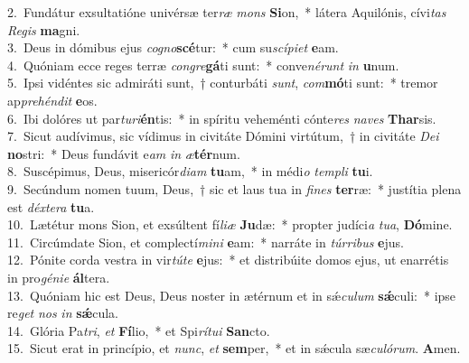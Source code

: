 {2.~}Fundátur exsultatióne univérsæ ter\textit{ræ} \textit{mons} \textbf{Si}on,~* látera Aquilónis, cívi\textit{tas} \textit{Re}\textit{gis} \textbf{ma}gni.\\
{3.~}Deus in dómibus ejus \textit{co}\textit{gno}\textbf{scé}tur:~* cum su\textit{scí}\textit{pi}\textit{et} \textbf{e}am.\\
{4.~}Quóniam ecce reges terræ \textit{con}\textit{gre}\textbf{gá}ti sunt:~* conve\textit{né}\textit{runt} \textit{in} \textbf{u}num.\\
{5.~}Ipsi vidéntes sic admiráti sunt,~† conturbáti \textit{sunt}, \textit{com}\textbf{mó}ti sunt:~* tremor ap\textit{pre}\textit{hén}\textit{dit} \textbf{e}os.\\
{6.~}Ibi dolóres ut par\textit{tu}\textit{ri}\textbf{én}tis:~* in spíritu veheménti cónte\textit{res} \textit{na}\textit{ves} \textbf{Thar}sis.\\
{7.~}Sicut audívimus, sic vídimus in civitáte Dómini virtútum,~† in civitáte \textit{De}\textit{i} \textbf{no}stri:~* Deus fundávit e\textit{am} \textit{in} \textit{æ}\textbf{tér}num.\\
{8.~}Suscépimus, Deus, misericór\textit{di}\textit{am} \textbf{tu}am,~* in médi\textit{o} \textit{tem}\textit{pli} \textbf{tu}i.\\
{9.~}Secúndum nomen tuum, Deus,~† sic et laus tua in \textit{fi}\textit{nes} \textbf{ter}ræ:~* justítia plena est \textit{déx}\textit{te}\textit{ra} \textbf{tu}a.\\
{10.~}Lætétur mons Sion, et exsúltent fí\textit{li}\textit{æ} \textbf{Ju}dæ:~* propter judíci\textit{a} \textit{tu}\textit{a}, \textbf{Dó}mine.\\
{11.~}Circúmdate Sion, et complectí\textit{mi}\textit{ni} \textbf{e}am:~* narráte in \textit{túr}\textit{ri}\textit{bus} \textbf{e}jus.\\
{12.~}Pónite corda vestra in vir\textit{tú}\textit{te} \textbf{e}jus:~* et distribúite domos ejus, ut enarrétis in pro\textit{gé}\textit{ni}\textit{e} \textbf{ál}tera.\\
{13.~}Quóniam hic est Deus, Deus noster in ætérnum et in sǽ\textit{cu}\textit{lum} \textbf{sǽ}culi:~* ipse re\textit{get} \textit{nos} \textit{in} \textbf{sǽ}cula.\\
{14.~}Glória Pa\textit{tri}, \textit{et} \textbf{Fí}lio,~* et Spi\textit{rí}\textit{tu}\textit{i} \textbf{San}cto.\\
{15.~}Sicut erat in princípio, et \textit{nunc}, \textit{et} \textbf{sem}per,~* et in sǽcula sæ\textit{cu}\textit{ló}\textit{rum}. \textbf{A}men.\\
